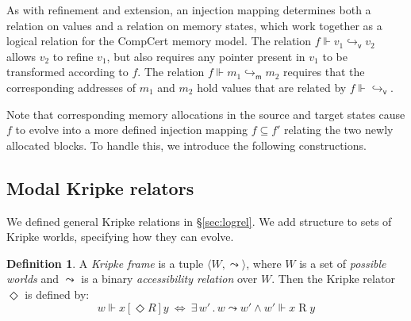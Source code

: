 \documentclass[draft,11pt]{report}
\theoremstyle{definition}
\newtheorem{definition}[theorem]{Definition}
\newcommand{\kw}[1]{\ensuremath{ \mathsf{#1} }}
\newcommand{\ifr}[1]{\mathrel{[{#1}]}}
\begin{document}
As with refinement and extension,
an injection mapping determines both
a relation on values and
a relation on memory states,
which work together
as a logical relation for the CompCert memory model.
The relation $f \Vdash v_1 \hookrightarrow_\kw{v} v_2$
allows $v_2$ to refine $v_1$,
but also requires any pointer present in $v_1$ 
to be transformed according to $f$.
The relation $f \Vdash m_1 \hookrightarrow_\kw{m} m_2$
requires that the corresponding addresses of $m_1$ and $m_2$
hold values that are related by $f \Vdash {\hookrightarrow_\kw{v}}$.

Note that corresponding memory allocations
in the source and target states cause $f$ to
evolve into a more defined injection mapping $f \subseteq f'$
relating the two newly allocated blocks.
To handle this,
we introduce the following constructions.


\subsection{Modal Kripke relators} %

We defined general Kripke relations in \S\ref{sec:logrel}.
We add structure to sets of Kripke worlds,
specifying how they can evolve.

\begin{definition} %
A \emph{Kripke frame} is a tuple
$\langle W, {\leadsto} \rangle$, where
$W$ is a set of \emph{possible worlds} and
$\leadsto$ is a
binary \emph{accessibility relation} over $W$.
Then the Kripke relator $\Diamond$ is defined by:
\[
  w \Vdash x \ifr{\Diamond R} y \: \Leftrightarrow \:
    \exists \, w' \,.\, w \leadsto w' \wedge
      w' \Vdash x \mathrel{R} y
\]
\end{definition}
\end{document}
